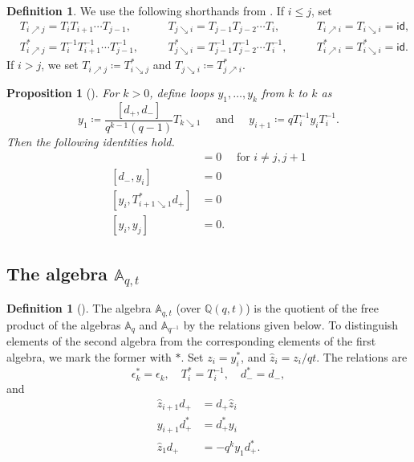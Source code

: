 \documentclass[reqno]{amsart}
\theoremstyle{plain}
\newtheorem{proposition}[theorem]{Proposition}
\theoremstyle{definition}
\newtheorem{definition}[theorem]{Definition}
\theoremstyle{remark}
\newcommand{\Q}{\mathbb{Q}}
\newcommand{\A}{\mathbb{A}}%
\newcommand{\z}{\widehat{z}}
\newcommand{\<}{\langle}
\renewcommand{\>}{\rangle}
\begin{document}
\begin{definition}
    We use the following shorthands from \cite{CarlssonMellit2018ShuffleConjecture}. If $i \leq j$, set
    \begin{align*}
        & T_{i \nearrow j} = T_i T_{i+1} \cdots T_{j-1}, && \quad T_{j \searrow i} = T_{j-1} T_{j-2} \cdots T_{i}, && \quad T_{i  \nearrow i} = T_{i \searrow i} = \mathsf{id}, \\
        & T_{i \nearrow j}^* = T_i^{-1} T_{i+1}^{-1} \cdots T_{j-1}^{-1}, && \quad T_{j \searrow i}^* = T_{j-1}^{-1} T_{j-2}^{-1} \cdots T_{i}^{-1}, && \quad T_{i \nearrow i}^* = T_{i \searrow i}^* = \mathsf{id}.
    \end{align*}
    If $i > j$, we set $T_{i \nearrow j} \coloneqq T_{i \searrow j}^*$ and $T_{j \searrow i} \coloneqq T_{j \nearrow i}^*$.
\end{definition}

\begin{proposition}[{\cite[Lemma~5.5]{CarlssonMellit2018ShuffleConjecture}}]
    For $k > 0$, define loops $y_1, \dots, y_k$ from $k$ to $k$ as
    \[ y_1 \coloneqq \frac{[d_+,d_-]}{q^{k-1}(q-1)}T_{k \searrow 1} \quad \text{ and } \quad y_{i+1} \coloneqq q T_i^{-1} y_i T_i^{-1}. \]
    Then the following identities hold.
    \begin{align}
        [y_i, T_j] & = 0 \quad \text{ for } i \neq j, j+1  \label{eq:yT_comm} \\
        [d_-, y_i] & = 0 \label{eq:yd-_comm} \\
        [y_i, T^*_{i+1 \searrow 1} d_+] & = 0 \label{eq:yd+_comm} \\
        [y_i,y_j] & = 0. \label{eq:yy_comm}
    \end{align}
\end{proposition}

\subsection{The algebra \texorpdfstring{$\A_{q,t}$}{Aqt}}

\begin{definition}[{\cite[Definition~3.9]{Mellit2021Rational}}]
    \label{def:Aqt}
    The algebra $\A_{q,t}$ (over $\Q(q,t)$) is the quotient of the free product of the algebras $\A_q$ and $\A_{q^{-1}}$ by the relations given below. To distinguish elements of the second algebra from the corresponding elements of the first algebra, we mark the former with $*$. Set $z_i = y_i^*$, and $\z_i = z_i/qt$. The relations are
    \[ \epsilon_k^* = \epsilon_k, \quad T_i^* = T_i^{-1}, \quad d_-^* = d_-, \]
    and
    \begin{align}
        \z_{i+1} d_+ & = d_+ \z_i \label{eq:Q1} \tag{Q1} \\
        y_{i+1} d_+^* & = d_+^* y_i \label{eq:Q1*} \tag{Q1*} \\
        \z_1 d_+ & = - q^k y_1 d_+^*. \label{eq:Q2} \tag{Q2}
    \end{align}
\end{definition}
\end{document}
